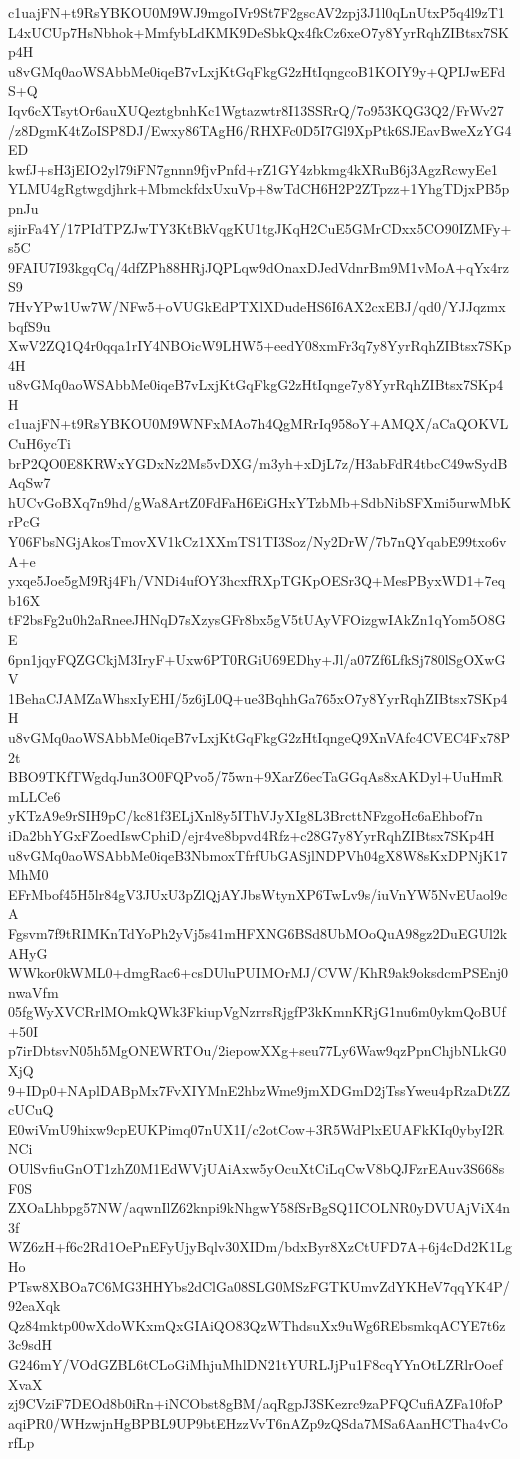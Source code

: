 c1uajFN+t9RsYBKOU0M9WJ9mgoIVr9St7F2gscAV2zpj3J1l0qLnUtxP5q4l9zT1
L4xUCUp7HsNbhok+MmfybLdKMK9DeSbkQx4fkCz6xeO7y8YyrRqhZIBtsx7SKp4H
u8vGMq0aoWSAbbMe0iqeB7vLxjKtGqFkgG2zHtIqngcoB1KOIY9y+QPIJwEFdS+Q
Iqv6cXTsytOr6auXUQeztgbnhKc1Wgtazwtr8I13SSRrQ/7o953KQG3Q2/FrWv27
/z8DgmK4tZoISP8DJ/Ewxy86TAgH6/RHXFc0D5I7Gl9XpPtk6SJEavBweXzYG4ED
kwfJ+sH3jEIO2yl79iFN7gnnn9fjvPnfd+rZ1GY4zbkmg4kXRuB6j3AgzRcwyEe1
YLMU4gRgtwgdjhrk+MbmckfdxUxuVp+8wTdCH6H2P2ZTpzz+1YhgTDjxPB5ppnJu
sjirFa4Y/17PIdTPZJwTY3KtBkVqgKU1tgJKqH2CuE5GMrCDxx5CO90IZMFy+s5C
9FAIU7I93kgqCq/4dfZPh88HRjJQPLqw9dOnaxDJedVdnrBm9M1vMoA+qYx4rzS9
7HvYPw1Uw7W/NFw5+oVUGkEdPTXlXDudeHS6I6AX2cxEBJ/qd0/YJJqzmxbqfS9u
XwV2ZQ1Q4r0qqa1rIY4NBOicW9LHW5+eedY08xmFr3q7y8YyrRqhZIBtsx7SKp4H
u8vGMq0aoWSAbbMe0iqeB7vLxjKtGqFkgG2zHtIqnge7y8YyrRqhZIBtsx7SKp4H
c1uajFN+t9RsYBKOU0M9WNFxMAo7h4QgMRrIq958oY+AMQX/aCaQOKVLCuH6ycTi
brP2QO0E8KRWxYGDxNz2Ms5vDXG/m3yh+xDjL7z/H3abFdR4tbcC49wSydBAqSw7
hUCvGoBXq7n9hd/gWa8ArtZ0FdFaH6EiGHxYTzbMb+SdbNibSFXmi5urwMbKrPcG
Y06FbsNGjAkosTmovXV1kCz1XXmTS1TI3Soz/Ny2DrW/7b7nQYqabE99txo6vA+e
yxqe5Joe5gM9Rj4Fh/VNDi4ufOY3hcxfRXpTGKpOESr3Q+MesPByxWD1+7eqb16X
tF2bsFg2u0h2aRneeJHNqD7sXzysGFr8bx5gV5tUAyVFOizgwIAkZn1qYom5O8GE
6pn1jqyFQZGCkjM3IryF+Uxw6PT0RGiU69EDhy+Jl/a07Zf6LfkSj780lSgOXwGV
1BehaCJAMZaWhsxIyEHI/5z6jL0Q+ue3BqhhGa765xO7y8YyrRqhZIBtsx7SKp4H
u8vGMq0aoWSAbbMe0iqeB7vLxjKtGqFkgG2zHtIqngeQ9XnVAfc4CVEC4Fx78P2t
BBO9TKfTWgdqJun3O0FQPvo5/75wn+9XarZ6ecTaGGqAs8xAKDyl+UuHmRmLLCe6
yKTzA9e9rSIH9pC/kc81f3ELjXnl8y5IThVJyXIg8L3BrcttNFzgoHc6aEhbof7n
iDa2bhYGxFZoedIswCphiD/ejr4ve8bpvd4Rfz+c28G7y8YyrRqhZIBtsx7SKp4H
u8vGMq0aoWSAbbMe0iqeB3NbmoxTfrfUbGASjlNDPVh04gX8W8sKxDPNjK17MhM0
EFrMbof45H5lr84gV3JUxU3pZlQjAYJbsWtynXP6TwLv9s/iuVnYW5NvEUaol9cA
Fgsvm7f9tRIMKnTdYoPh2yVj5s41mHFXNG6BSd8UbMOoQuA98gz2DuEGUl2kAHyG
WWkor0kWML0+dmgRac6+csDUluPUIMOrMJ/CVW/KhR9ak9oksdcmPSEnj0nwaVfm
05fgWyXVCRrlMOmkQWk3FkiupVgNzrrsRjgfP3kKmnKRjG1nu6m0ykmQoBUf+50I
p7irDbtsvN05h5MgONEWRTOu/2iepowXXg+seu77Ly6Waw9qzPpnChjbNLkG0XjQ
9+IDp0+NAplDABpMx7FvXIYMnE2hbzWme9jmXDGmD2jTssYweu4pRzaDtZZcUCuQ
E0wiVmU9hixw9cpEUKPimq07nUX1I/c2otCow+3R5WdPlxEUAFkKIq0ybyI2RNCi
OUlSvfiuGnOT1zhZ0M1EdWVjUAiAxw5yOcuXtCiLqCwV8bQJFzrEAuv3S668sF0S
ZXOaLhbpg57NW/aqwnIlZ62knpi9kNhgwY58fSrBgSQ1ICOLNR0yDVUAjViX4n3f
WZ6zH+f6c2Rd1OePnEFyUjyBqlv30XIDm/bdxByr8XzCtUFD7A+6j4cDd2K1LgHo
PTsw8XBOa7C6MG3HHYbs2dClGa08SLG0MSzFGTKUmvZdYKHeV7qqYK4P/92eaXqk
Qz84mktp00wXdoWKxmQxGIAiQO83QzWThdsuXx9uWg6REbsmkqACYE7t6z3c9sdH
G246mY/VOdGZBL6tCLoGiMhjuMhlDN21tYURLJjPu1F8cqYYnOtLZRlrOoefXvaX
zj9CVziF7DEOd8b0iRn+iNCObst8gBM/aqRgpJ3SKezrc9zaPFQCufiAZFa10foP
aqiPR0/WHzwjnHgBPBL9UP9btEHzzVvT6nAZp9zQSda7MSa6AanHCTha4vCorfLp
